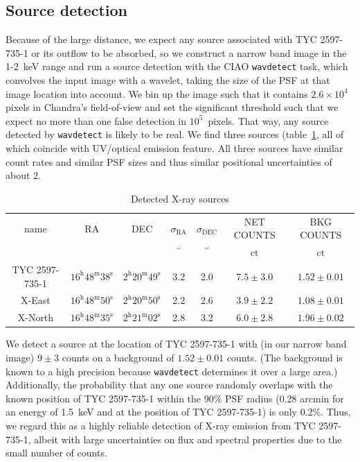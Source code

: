 \documentclass[linenumbers]{aastex631}
\begin{document}
\subsection{Source detection}
Because of the large distance, we expect any source associated with TYC 2597-735-1 or its outflow to be absorbed, so we construct a narrow band image in the 1-2~keV range and run a source detection with the CIAO \texttt{wavdetect} task, which convolves the input image with a wavelet, taking the size of the PSF at that image location into account. We bin up the image such that it contains $2.6\times10^4$ pixels in Chandra's field-of-view and set the significant threshold such that we expect no more than one false detection in $10^5$~pixels. That way, any source detected by \texttt{wavdetect} is likely to be real. We find three sources (table~\ref{tab:src}, all of which coincide with UV/optical emission feature. All three sources have similar count rates and similar PSF sizes and thus similar positional uncertainties of about 2\arcsec{}.
\begin{table}
\caption{Detected X-ray sources\label{tab:src}}
\begin{tabular}{ccccccc}
\hline \hline
name & RA & DEC & $\sigma_\mathrm{RA}$ & $\sigma_\mathrm{DEC}$ & NET COUNTS & BKG COUNTS \\
 &  &  & $\mathrm{{}^{\prime\prime}}$ & $\mathrm{{}^{\prime\prime}}$ & $\mathrm{ct}$ & $\mathrm{ct}$  \\
\hline
TYC 2597-735-1 & $16^\mathrm{h}48^\mathrm{m}38^\mathrm{s}$ & $2^\mathrm{h}20^\mathrm{m}49^\mathrm{s}$ & 3.2 & 2.0 & $7.5 \pm 3.0$ & $1.52 \pm 0.01$ \\
X-East & $16^\mathrm{h}48^\mathrm{m}50^\mathrm{s}$ & $2^\mathrm{h}20^\mathrm{m}50^\mathrm{s}$ & 2.2 & 2.6 & $3.9 \pm 2.2$ & $1.08 \pm 0.01 $\\
X-North & $16^\mathrm{h}48^\mathrm{m}35^\mathrm{s}$ & $2^\mathrm{h}21^\mathrm{m}02^\mathrm{s}$ & 2.8 & 3.2 & $6.0 \pm 2.8$ & $1.96 \pm 0.02$ \\
\hline
\end{tabular}
\end{table}


We detect a source at the location of TYC 2597-735-1 with (in our narrow band image) $9\pm3$ counts on a background of $1.52\pm0.01$ counts. (The background is known to a high precision because \texttt{wavdetect} determines it over a large area.) Additionally, the probability that any one source randomly overlaps with the known position of TYC 2597-735-1 within the 90\% PSF radius (0.28 arcmin for an energy of 1.5~keV and at the position of TYC 2597-735-1) is only 0.2\%. Thus, we regard this as a highly reliable detection of X-ray emission from TYC 2597-735-1, albeit with large uncertainties on flux and spectral properties due to the small number of counts.
\end{document}
